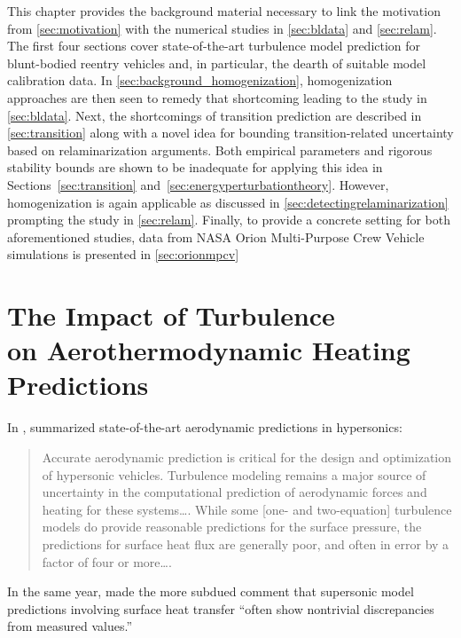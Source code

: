 \label{sec:review}

This chapter provides the background material necessary to link the
motivation from \autoref{sec:motivation} with the numerical
studies in \autoref{sec:bldata} and \autoref{sec:relam}.  The first four
sections cover state-of-the-art turbulence model prediction for blunt-bodied
reentry vehicles and, in particular, the dearth of suitable model calibration
data.  In \autoref{sec:background_homogenization}, homogenization approaches are
then seen to remedy that shortcoming leading to the study in
\autoref{sec:bldata}.  Next, the shortcomings of transition prediction are
described in \autoref{sec:transition} along with a novel idea for bounding
transition-related uncertainty based on relaminarization arguments.  Both
empirical parameters and rigorous stability bounds are shown to be inadequate
for applying this idea
in Sections~\ref{sec:transition} and~\ref{sec:energyperturbationtheory}.
However, homogenization is again applicable as discussed
in \autoref{sec:detectingrelaminarization} prompting the study in
\autoref{sec:relam}.  Finally, to provide a concrete setting for both aforementioned studies,
data from NASA Orion Multi-Purpose Crew Vehicle simulations is presented in
\autoref{sec:orionmpcv}

\section[The Impact of Turbulence on Aerothermodynamic Heating Predictions]
        {The Impact of Turbulence\\on Aerothermodynamic Heating Predictions}
\label{sec:impact}

In \citeyear{Roy2006Review}, \citet{Roy2006Review} summarized state-of-the-art
aerodynamic predictions in hypersonics:
\begin{quotation}
Accurate aerodynamic prediction is critical for the design and optimization of
hypersonic vehicles. Turbulence modeling remains a major source of uncertainty
in the computational prediction of aerodynamic forces and heating for these
systems\ldots{}.  While some [one- and two-equation] turbulence models do
provide reasonable predictions for the surface pressure, the predictions for
surface heat flux are generally poor, and often in error by a factor of four or
more\ldots{}.
\end{quotation}
In the same year, \citet[\textsection{}5.7]{Wilcox2006Turbulence} made the more
subdued comment that supersonic model predictions involving surface heat
transfer ``often show nontrivial discrepancies from measured values.''

